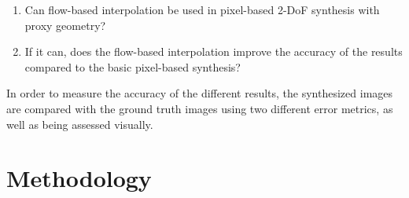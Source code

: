 \begin{enumerate}
  \item Can flow-based interpolation be used in pixel-based 2-DoF synthesis with proxy geometry?
  \item If it can, does the flow-based interpolation improve the accuracy of the results compared to the basic pixel-based synthesis?
\end{enumerate}

In order to measure the accuracy of the different results, the synthesized images are compared with the ground truth images using two different error metrics, as well as being assessed visually.


\section*{Methodology}
%

